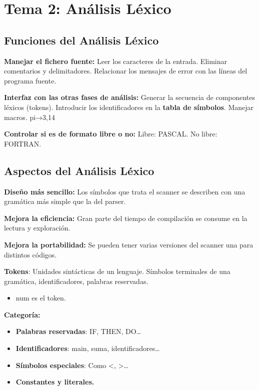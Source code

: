 \documentclass[12pt, twoside, openright]{report} %
\begin{document}
\chapter{Tema 2: Análisis Léxico}

\begin{figure}[H]
  {\def\svgwidth{.8\textwidth}
  }
\end{figure}

\section{Funciones del Análisis Léxico}

\textbf{Manejar el fichero fuente:} Leer los caracteres de la entrada.
Eliminar comentarios y delimitadores. Relacionar los mensajes de error
con las líneas del programa fuente.

\textbf{Interfaz con las otras fases de análisis:} Generar la secuencia
de componentes léxicos (tokens). Introducir los identificadores en la
\textbf{tabla de símbolos}. Manejar macros. pi→3,14

\textbf{Controlar si es de formato libre o no:} Libre: PASCAL. No libre:
FORTRAN.


\section{Aspectos del Análisis Léxico}

\textbf{Diseño más sencillo:} Los símbolos que trata el scanner se
describen con una gramática más simple que la del parser.

\textbf{Mejora la eficiencia:} Gran parte del tiempo de compilación se
consume en la lectura y exploración.

\textbf{Mejora la portabilidad:} Se pueden tener varias versiones del
scanner una para distintos códigos.

\textbf{Tokens}: Unidades sintácticas de un lenguaje. Símbolos
terminales de una gramática, identificadores, palabras reservadas.

\begin{itemize}

\item
  num es el token.
\end{itemize}

\textbf{Categoría:}

\begin{itemize}
\item
  \textbf{Palabras reservadas}: IF, THEN, DO\ldots{}
\item
  \textbf{Identificadores}: main, suma, identificadores\ldots{}
\item
  \textbf{Símbolos especiales}: Como \textless, \textgreater\ldots{}
\item
  \textbf{Constantes y literales.}
\end{itemize}
\end{document}
